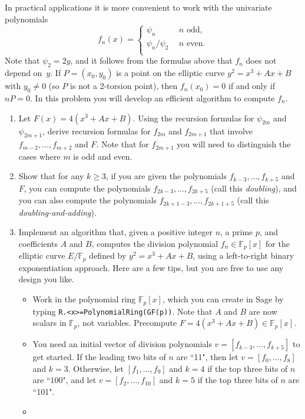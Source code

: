 \documentclass[11pt]{article}
\newcommand{\Fp}{\mathbb{F}_p}
\begin{document}
\noindent
In practical applications it is more convenient to work with the univariate polynomials
\[
f_n(x) = \begin{cases}
\psi_n\qquad&n \text{ odd},\\
\psi_n/\psi_2&n \text{ even}.\\
\end{cases}
\]
Note that $\psi_2=2y$, and it follows from the formulas above that $f_n$ does not depend on~$y$.  If $P=(x_0,y_0)$ is
a point on the elliptic curve $y^2=x^3+Ax+B$ with $y_0\ne 0$ (so $P$ is not a 2-torsion point), then $f_n(x_0)=0$ if and only if $nP=0$.
In this problem you will develop an efficient algorithm to compute $f_n$.

\begin{enumerate}[{\bf (a)}]
\item Let $F(x)=4(x^3+Ax+B)$.  Using the recursion formulas for $\psi_{2m}$ and $\psi_{2m+1}$, derive recursion formulas for $f_{2m}$ and $f_{2m+1}$ that involve $f_{m-2},\ldots,f_{m+2}$ and $F$.  Note that for $f_{2m+1}$ you will need to distinguish the cases where $m$ is odd and even.
\item Show that for any $k\ge 3$, if you are given the polynomials $f_{k-3},\ldots,f_{k+5}$ and $F$, you can compute the polynomials
$f_{2k-3},\ldots,f_{2k+5}$ (call this \emph{doubling}), and you can also compute the polynomials $f_{2k+1-3},\ldots,f_{2k+1+5}$ (call this \emph{doubling-and-adding}).
\item Implement an algorithm that, given a positive integer $n$, a prime $p$, and coefficients $A$ and $B$, computes the division polynomial $f_n\in\Fp[x]$ for the elliptic curve $E/\Fp$ defined by $y^2=x^3+Ax+B$, using a left-to-right binary exponentiation approach.
Here are a few tips, but you are free to use any design you like.
\begin{itemize}
\item
Work in the polynomial ring $\Fp[x]$, which you can create in Sage by typing \texttt{R.<x>=PolynomialRing(GF(p))}.
Note that $A$ and $B$ are now scalars in $\Fp$, not variables.  Precompute $F=4(x^3+Ax+B)\in\Fp[x]$.
\item 
You need an initial vector of division polynomials $v=[f_{k-3},\ldots,f_{k+5}]$ to get started.
If the leading two bits of $n$ are ``11", then let $v=[f_0,\ldots,f_8]$ and $k=3$. Otherwise, let $[f_1,\ldots,f_9]$ and $k=4$ if the top three bits of $n$ are ``100", and let $v = [f_2,\ldots,f_{10}]$ and $k=5$ if the top three bits of $n$ are ``101".
\item

\end{itemize}
\end{enumerate}
\end{document}
